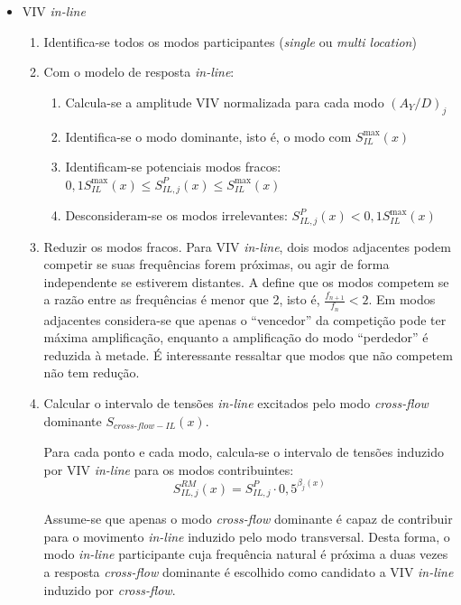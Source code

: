\begin{itemize}
\item VIV \textit{in-line}

\begin{enumerate}
    \item Identifica-se todos os modos participantes (\textit{single} ou \textit{multi location})

    \item Com o modelo de resposta \textit{in-line}:

    \begin{enumerate}
    	\item Calcula-se a amplitude VIV normalizada para cada modo ${(A_Y/D)}_j$

    	\item Identifica-se o modo dominante, isto é, o modo com $S_\mathit{IL}^{\max}(x)$

    	\item Identificam-se potenciais modos fracos: $0,1 S_\mathit{IL}^{\max}(x) \leq S_{\mathit{IL}, \mathit{j}}^{P}(x) \leq S_\mathit{IL}^{\max}(x)$

    	\item Desconsideram-se os modos irrelevantes: $S_{\mathit{IL}, \mathit{j}}^{P}(x) < 0,1 S_\mathit{IL}^{\max}(x)$
    \end{enumerate}

        \item Reduzir os modos fracos.
        Para VIV \textit{in-line}, dois modos adjacentes podem competir se suas frequências forem próximas, ou agir de forma independente se estiverem distantes.
        A  define que os modos competem se a razão entre as frequências é menor que 2, isto é, $\frac{f_\mathit{n+1}}{f_n} < 2$.
        Em modos adjacentes considera-se que apenas o ``vencedor'' da competição pode ter máxima amplificação, enquanto a amplificação do modo ``perdedor'' é reduzida à metade. É interessante ressaltar que modos que não competem não tem redução.

        \item Calcular o intervalo de tensões \textit{in-line} excitados pelo modo \textit{cross-flow} dominante $S_{\mathit{\textit{cross-flow}}-\mathit{IL}}(x)$.

        Para cada ponto e cada modo, calcula-se o intervalo de tensões induzido por VIV \textit{in-line} para os modos contribuintes:
        		\[S_{\mathit{IL}, \mathit{j}}^\mathit{RM}(x) = S_{\mathit{IL}, \mathit{j}}^{P} \cdot 0,5^{\beta_j (x)}\]

        Assume-se que apenas o modo \textit{cross-flow} dominante é capaz de contribuir para o movimento \textit{in-line} induzido pelo modo transversal.
        Desta forma, o modo \textit{in-line} participante cuja frequência natural é próxima a duas vezes a resposta \textit{cross-flow} dominante é escolhido como candidato a VIV \textit{in-line} induzido por \textit{cross-flow}.


\end{enumerate}
\end{itemize}
